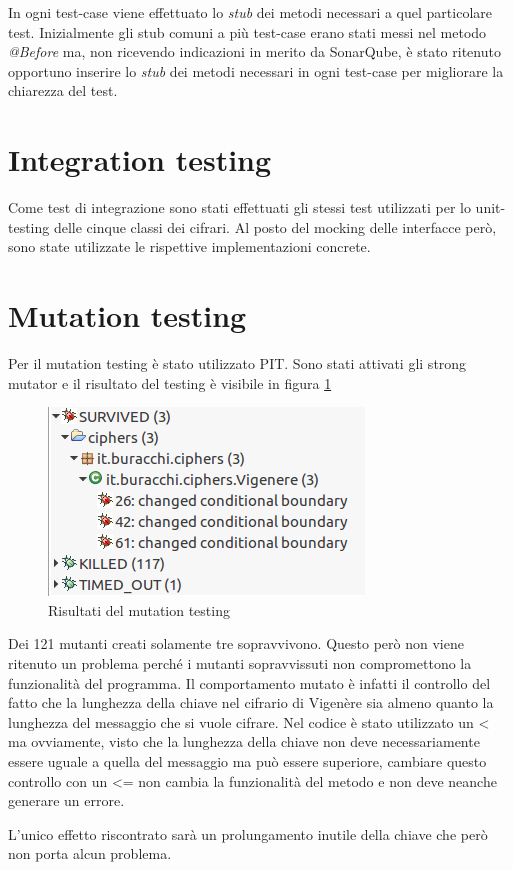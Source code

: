 		In ogni test-case viene effettuato lo \emph{stub} dei metodi necessari a quel particolare test. Inizialmente gli stub comuni a più test-case erano stati messi nel metodo \emph{@Before} ma, non ricevendo indicazioni in merito da SonarQube, è stato ritenuto opportuno inserire lo \emph{stub} dei metodi necessari in ogni test-case per migliorare la chiarezza del test.
		
	\section{Integration testing}
		Come test di integrazione sono stati effettuati gli stessi test utilizzati per lo unit-testing delle cinque classi dei cifrari. Al posto del mocking delle interfacce però, sono state utilizzate le rispettive implementazioni concrete.
		
	\section{Mutation testing}
		Per il mutation testing è stato utilizzato PIT. Sono stati attivati gli strong mutator e il risultato del testing è visibile in figura \ref{fig:pit}
		
		\begin{figure}[h]
			\centering
			\includegraphics[scale=0.5]{img/PIT}
			\caption{Risultati del mutation testing}
			\label{fig:pit}
		\end{figure}
		
		Dei 121 mutanti creati solamente tre sopravvivono. Questo però non viene ritenuto un problema perché i mutanti sopravvissuti non compromettono la funzionalità del programma. Il comportamento mutato è infatti il controllo del fatto che la lunghezza della chiave nel cifrario di Vigenère sia almeno quanto la lunghezza del messaggio che si vuole cifrare. Nel codice è stato utilizzato un < ma ovviamente, visto che la lunghezza della chiave non deve necessariamente essere uguale a quella del messaggio ma può essere superiore, cambiare questo controllo con un <= non cambia la funzionalità del metodo e non deve neanche generare un errore.
		
		L'unico effetto riscontrato sarà un prolungamento inutile della chiave che però non porta alcun problema.
		